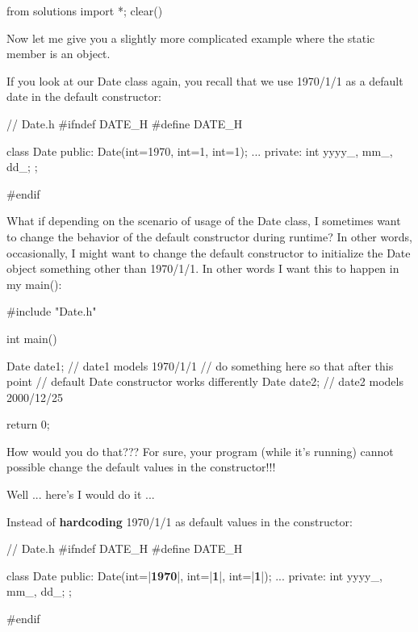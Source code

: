 \begin{python0}
from solutions import *; clear()
\end{python0}

Now let me give you a slightly more complicated example where the static
member is an object.

If you look at our Date class again, you recall that we use 1970/1/1 as
a default date in the default constructor:

\begin{consolethree}[escapeinside=||]
// Date.h
#ifndef DATE_H
#define DATE_H

class Date
{
public:
    Date(int=1970, int=1, int=1);
    ...
private:
    int yyyy_, mm_, dd_;
};

#endif
\end{consolethree}

What if depending on the scenario of usage of the Date class, I
sometimes want to change the behavior of the default constructor during
runtime? In other words, occasionally, I might want to change the
default constructor to initialize the Date object something other than
1970/1/1. In other words I want this to happen in my main():

\begin{consolethree}[escapeinside=||]
#include "Date.h"

int main()
{
    Date date1; // date1 models 1970/1/1
    // do something here so that after this point
    // default Date constructor works differently
    Date date2; // date2 models 2000/12/25

    return 0;
}
\end{consolethree}

How would you do that??? For sure, your program (while
it's running) cannot possible change the default values
in the constructor!!!

Well ... here's I would do it ...

Instead of \textbf{hardcoding} 1970/1/1 as default values in the
constructor:

\begin{consolethree}[escapeinside=||]
// Date.h
#ifndef DATE_H
#define DATE_H

class Date
{
public:
    Date(int=|{\bf 1970}|, int=|{\bf 1}|, int=|{\bf 1}|);
    ...
private:
    int yyyy_, mm_, dd_;
};

#endif
\end{consolethree}

